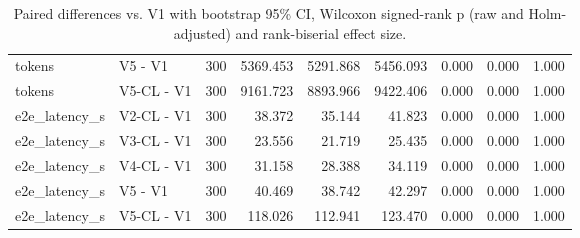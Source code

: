 \begin{table}[t]
\begin{tabular}{llrrrrrrr}
tokens & V5 - V1 & 300 & 5369.453 & 5291.868 & 5456.093 & 0.000 & 0.000 & 1.000 \\
tokens & V5-CL - V1 & 300 & 9161.723 & 8893.966 & 9422.406 & 0.000 & 0.000 & 1.000 \\
e2e\_latency\_s & V2-CL - V1 & 300 & 38.372 & 35.144 & 41.823 & 0.000 & 0.000 & 1.000 \\
e2e\_latency\_s & V3-CL - V1 & 300 & 23.556 & 21.719 & 25.435 & 0.000 & 0.000 & 1.000 \\
e2e\_latency\_s & V4-CL - V1 & 300 & 31.158 & 28.388 & 34.119 & 0.000 & 0.000 & 1.000 \\
e2e\_latency\_s & V5 - V1 & 300 & 40.469 & 38.742 & 42.297 & 0.000 & 0.000 & 1.000 \\
e2e\_latency\_s & V5-CL - V1 & 300 & 118.026 & 112.941 & 123.470 & 0.000 & 0.000 & 1.000 \\
\bottomrule
\end{tabular}
\caption{Paired differences vs. V1 with bootstrap 95\% CI, Wilcoxon signed-rank p (raw and Holm-adjusted) and rank-biserial effect size.}
\label{tab:rigor_paired_tests}
\end{table}
